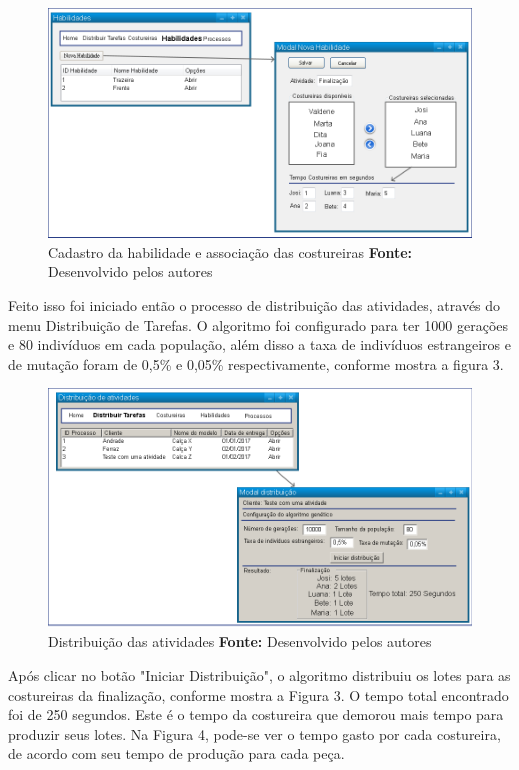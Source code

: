 \begin{figure}[h!]
	\centerline{\includegraphics[scale=0.4]{./imagens/test_case_1_habilidades.png}}
	\caption[Caso de teste Habilidade]
	{Cadastro da habilidade e associação das costureiras \textbf{Fonte:} Desenvolvido pelos autores}
	\label{fig:exemplo1}
\end{figure}

\par Feito isso foi iniciado então o processo de distribuição das atividades, através do menu Distribuição de Tarefas.
O algoritmo foi configurado para ter 1000 gerações e 80 indivíduos em cada população, além disso a taxa de indivíduos
estrangeiros e de mutação foram de 0,5\% e 0,05\% respectivamente, conforme
mostra a figura 3.

\begin{figure}[h!]
	\centerline{\includegraphics[scale=0.4]{./imagens/test_case1_distribuicao.png}}
	\caption[Caso de teste Habilidade]
	{Distribuição das atividades \textbf{Fonte:} Desenvolvido pelos autores}
	\label{fig:exemplo1}
\end{figure}

\par Após clicar no botão "Iniciar Distribuição", o algoritmo distribuiu os lotes para as costureiras da finalização,
conforme mostra a Figura 3. O tempo total encontrado foi de 250 segundos. Este é
o tempo da costureira que demorou mais tempo para produzir seus lotes. Na Figura
4, pode-se ver o tempo gasto por cada costureira, de acordo com seu tempo de produção para cada peça.


